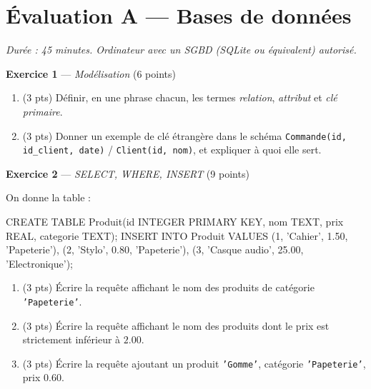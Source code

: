 \section*{Évaluation A --- Bases de données}
\textit{Durée : 45 minutes. Ordinateur avec un SGBD (SQLite ou équivalent) autorisé.}


\bigskip

\textbf{Exercice 1} --- \textit{Modélisation} \hfill (6 points)

\begin{enumerate}
  \item (3 pts) Définir, en une phrase chacun, les termes \textit{relation}, \textit{attribut} et \textit{clé primaire}.
  \item (3 pts) Donner un exemple de clé étrangère dans le schéma \texttt{Commande(id, id\_client, date)} / \texttt{Client(id, nom)}, et expliquer à quoi elle sert.
\end{enumerate}

\bigskip

\textbf{Exercice 2} --- \textit{SELECT, WHERE, INSERT} \hfill (9 points)

On donne la table :
\begin{sql}
CREATE TABLE Produit(id INTEGER PRIMARY KEY, nom TEXT, prix REAL, categorie TEXT);
INSERT INTO Produit VALUES
  (1, 'Cahier', 1.50, 'Papeterie'),
  (2, 'Stylo', 0.80, 'Papeterie'),
  (3, 'Casque audio', 25.00, 'Electronique');
\end{sql}
\begin{enumerate}
  \item (3 pts) Écrire la requête affichant le nom des produits de catégorie \texttt{'Papeterie'}.
  \item (3 pts) Écrire la requête affichant le nom des produits dont le prix est strictement inférieur à $2.00$.
  \item (3 pts) Écrire la requête ajoutant un produit \texttt{'Gomme'}, catégorie \texttt{'Papeterie'}, prix $0.60$.
\end{enumerate}

